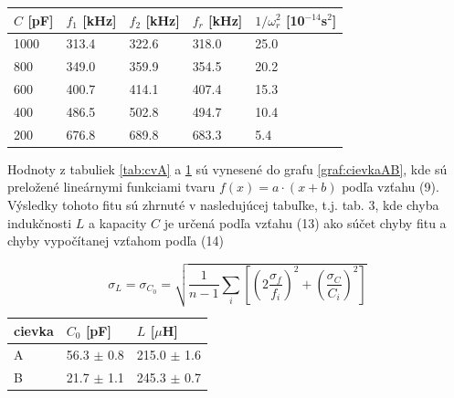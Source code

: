 \documentclass{article}
\begin{document}
\begin{table}[!htbp]
\label{tab:cvB}
\centering
\begin{tabular}{|l|l|l|l|l|}
\hline
$C$ [pF] & $f_1$ [kHz] & $f_2$ [kHz] &   $f_r$ [kHz]    &   $1/\omega_r^2$ [10$^{-14}$s$^2$]   \\ \hline
1000    & 313.4   & 322.6   & 318.0 & 25.0 \\ \hline
800     & 349.0   & 359.9   & 354.5 & 20.2 \\ \hline
600     & 400.7   & 414.1   & 407.4 & 15.3 \\ \hline
400     & 486.5   & 502.8   & 494.7 & 10.4 \\ \hline
200     & 676.8   & 689.8   & 683.3 & 5.4  \\ \hline
\end{tabular}
\end{table}

\newpage
Hodnoty z tabuliek \ref{tab:cvA} a \ref{tab:cvB} sú vynesené do grafu \ref{graf:cievkaAB}, kde sú preložené lineárnymi funkciami tvaru $f(x) = a{\cdot}(x+b)$ podľa vzťahu (9). Výsledky tohoto fitu sú zhrnuté v nasledujúcej tabuľke, t.j. tab. 3, kde chyba indukčnosti $L$ a kapacity $C$ je určená podľa vzťahu (13) ako súčet chyby fitu a chyby vypočítanej vzťahom podľa (14)

\begin{equation} \label{eq:cvchyba}
    \sigma_L = \sigma_{C_0} = \sqrt{\frac{1}{n-1}\sum_i \left[ \left(2\frac{\sigma_f}{f_i} \right)^2 + \left(\frac{\sigma_C}{C_i} \right)^2 \right]}
\end{equation}

\begin{graph}[H]
		\centering
		
		\caption{Závislosť prevrátenej hodnoty druhej mocniny uhlovej frekvencie na kapacite $C$ pre jednotlivé cievky}
		\label{graf:cievkaAB}
\end{graph}

\begin{table}[!htbp]
\centering
\begin{tabular}{|l|l|l|}
\hline
 cievka & $C_0$ [pF] & $L$ [$\mu$H] \\ \hline
 A   & 56.3 $\pm$  0.8  & 215.0 $\pm$ 1.6   \\ \hline
 B   & 21.7 $\pm$ 1.1   & 245.3 $\pm$ 0.7    \\ \hline

\end{tabular}
\end{table}
\end{document}
